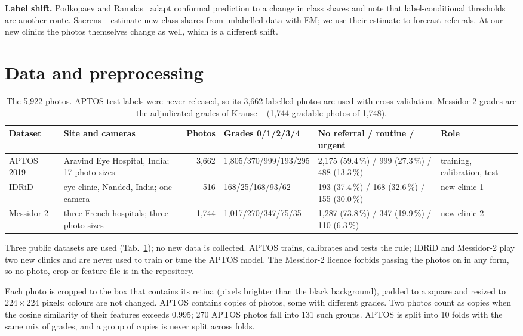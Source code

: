 \documentclass[10pt,twocolumn,letterpaper]{article}
\newcommand{\pct}{\,\%}
\begin{document}
\textbf{Label shift.} Podkopaev and Ramdas~\cite{podkopaev} adapt conformal prediction to a change in class shares and note that label-conditional thresholds are another route. Saerens \etal~\cite{saerens} estimate new class shares from unlabelled data with EM; we use their estimate to forecast referrals. At our new clinics the photos themselves change as well, which is a different shift.

\section{Data and preprocessing}\label{sec:data}
\begin{table}[t]\centering\small
\begin{adjustbox}{max width=\linewidth}\begin{tabular}{@{}llrlll@{}}\toprule
Dataset & Site and cameras & Photos & Grades 0/1/2/3/4 & No referral / routine / urgent & Role\\\midrule
APTOS 2019~\cite{aptos} & Aravind Eye Hospital, India; 17 photo sizes & 3,662 & 1,805/370/999/193/295 & 2,175 (59.4\pct) / 999 (27.3\pct) / 488 (13.3\pct) & training, calibration, test\\
IDRiD~\cite{idrid} & eye clinic, Nanded, India; one camera & 516 & 168/25/168/93/62 & 193 (37.4\pct) / 168 (32.6\pct) / 155 (30.0\pct) & new clinic 1\\
Messidor-2~\cite{decenciere,abramoff13} & three French hospitals; three photo sizes & 1,744 & 1,017/270/347/75/35 & 1,287 (73.8\pct) / 347 (19.9\pct) / 110 (6.3\pct) & new clinic 2\\\bottomrule
\end{tabular}\end{adjustbox}
\caption{The 5,922 photos. APTOS test labels were never released, so its 3,662 labelled photos are used with cross-validation. Messidor-2 grades are the adjudicated grades of Krause \etal~\cite{krause} (1,744 gradable photos of 1,748).}\label{tab:data}
\end{table}
Three public datasets are used (Tab.~\ref{tab:data}); no new data is collected. APTOS trains, calibrates and tests the rule; IDRiD and Messidor-2 play two new clinics and are never used to train or tune the APTOS model. The Messidor-2 licence forbids passing the photos on in any form, so no photo, crop or feature file is in the repository.

Each photo is cropped to the box that contains its retina (pixels brighter than the black background), padded to a square and resized to $224{\times}224$ pixels; colours are not changed. APTOS contains copies of photos, some with different grades. Two photos count as copies when the cosine similarity of their features exceeds 0.995; 270 APTOS photos fall into 131 such groups. APTOS is split into 10 folds with the same mix of grades, and a group of copies is never split across folds.
\end{document}
